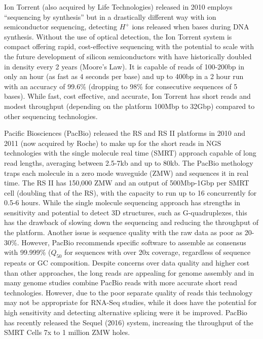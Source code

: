 
Ion Torrent (also acquired by Life Technologies) released in 2010 employs ``sequencing by synthesis'' but in a drastically different way with ion semiconductor sequencing, detecting $H^+$ ions released when bases during DNA synthesis. Without the use of optical detection, the Ion Torrent system is compact offering rapid, cost-effective sequencing with the potential to scale with the future development of silicon semiconductors with have historically doubled in density every 2 years (Moore's Law). It is capable of reads of 100-200bp in only an hour (as fast as 4 seconds per base) and up to 400bp in a 2 hour run with an accuracy of 99.6\% (dropping to 98\% for consecutive sequences of 5 bases). While fast, cost effective, and accurate, Ion Torrent has short reads and modest throughput (depending on the platform 100Mbp to 32Gbp) compared to other sequencing technologies.

Pacific Biosciences (PacBio) released the RS and RS II platforms in 2010 and 2011 (now acquired by Roche) to make up for the short reads in NGS technologies with the single molecule real time (SMRT) approach capable of long read lengths, averaging between 2.5-7kb and up to 80kb. The PacBio methology traps each molecule in a zero mode waveguide (ZMW) and sequences it in real time. The RS II has 150,000 ZMW and an output of 500Mbp-1Gbp per SMRT cell (doubling that of the RS), with the capacity to run up to 16 concurrently for 0.5-6 hours. While the single molecule sequencing approach has strengths in sensitivity and potential to detect 3D structures, such as G-quadruplexes, this has the drawback of slowing down the sequencing and reducing the throughput of the platform. Another issue is sequence quality with the raw data as poor as 20-30\%. However, PacBio recommends specific software to assemble as consensus with 99.999\% ($Q_{50}$ for sequences with over 20x coverage, regardless of sequence repeats or GC composition. Despite concerns over data quality and higher cost than other approaches, the long reads are appealing for genome assembly and in many genome studies combine PacBio reads with more accurate short read technologies. However, due to the poor separate quality of reads this technology may not be appropriate for RNA-Seq studies, while it does have the potential for high sensitivity and detecting alternative splicing were it be improved. PacBio has recently released the Sequel (2016) system, increasing the throughput of the SMRT Cells 7x to 1 million ZMW holes. 

